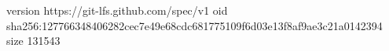 version https://git-lfs.github.com/spec/v1
oid sha256:127766348406282cec7e49e68cdc681775109f6d03e13f8af9ae3c21a0142394
size 131543
